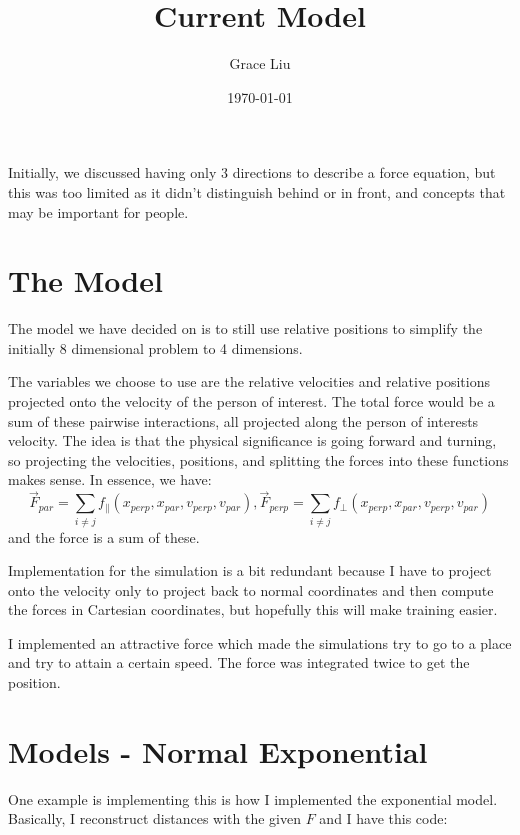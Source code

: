 \documentclass{article}
\title{Current Model}
\author{Grace Liu}
\date{\today}
\begin{document}
\maketitle

Initially, we discussed having only 3 directions to describe a force equation, but this was too limited as it didn't distinguish behind or in front, and concepts that may be important for people.

\section{The Model}

The model we have decided on is to still use relative positions to simplify the initially 8 dimensional problem to 4 dimensions. 

The variables we choose to use are the relative velocities and relative positions projected onto the velocity of the person of interest. The total force would be a sum of these pairwise interactions, all projected along the person of interests velocity. The idea is that the physical significance is going forward and turning, so projecting the velocities, positions, and splitting the forces into these functions makes sense. In essence, we have:
\[
\vec{F}_{par} = \sum_{i \neq j} f_\parallel(x_{perp}, x_{par}, v_{perp}, v_{par}), \vec{F}_{perp} = \sum_{i \neq j} f_\perp(x_{perp}, x_{par}, v_{perp}, v_{par})
\]
and the force is a sum of these. 

Implementation for the simulation is a bit redundant because I have to project onto the velocity only to project back to normal coordinates and then compute the forces in Cartesian coordinates, but hopefully this will make training easier.

I implemented an attractive force which made the simulations try to go to a place and try to attain a certain speed. The force was integrated twice to get the position.

\newpage
\section{Models - Normal Exponential} One example is implementing this is how I implemented the exponential model. Basically, I reconstruct distances with the given $F$ and I have this code:
\end{document}
